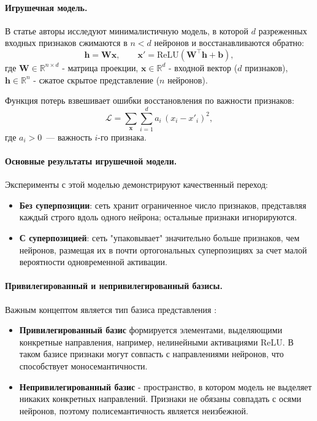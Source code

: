 \documentclass[a4paper,14pt]{extreport}
\begin{document}
\paragraph{Игрушечная модель.}
В статье \cite{elhage2022superposition} авторы исследуют минималистичную модель,
в которой $d$ разреженных входных признаков сжимаются в $n < d$ нейронов и
восстанавливаются обратно:
\begin{equation}
    \mathbf{h} = \mathbf{W}\mathbf{x},
    \qquad
    \mathbf{x}' = \mathrm{ReLU}\!\left(\mathbf{W}^{\!\top} \mathbf{h} + \mathbf{b}\right),
    \label{eq:toy_model}
\end{equation}
где $\mathbf{W} \in \mathbb{R}^{n \times d}$ - матрица проекции,
$\mathbf{x} \in \mathbb{R}^d$ - входной вектор ($d$ признаков),
$\mathbf{h} \in \mathbb{R}^n$ - сжатое скрытое представление ($n$ нейронов).

Функция потерь взвешивает ошибки восстановления по важности признаков:
\begin{equation}
    \mathcal{L} = \sum_{\mathbf{x}} \sum_{i=1}^{d} a_i\,(x_i - x'_i)^2,
    \label{eq:toy_loss}
\end{equation}
где $a_i > 0$~--- важность $i$-го признака.

\paragraph{Основные результаты игрушечной модели.}
Эксперименты с этой моделью демонстрируют качественный переход:
\begin{itemize}
    \item \textbf{Без суперпозиции}: сеть хранит ограниченное
          число признаков, представляя каждый строго вдоль одного нейрона; остальные
          признаки игнорируются.
    \item \textbf{С суперпозицией}: сеть "упаковывает"
          значительно больше признаков, чем нейронов, размещая их в почти ортогональных
          суперпозициях за счет малой вероятности одновременной активации.
\end{itemize}

\paragraph{Привилегированный и непривилегированный базисы.}
Важным концептом является тип базиса представления \cite{bereska2024mechanistic}:
\begin{itemize}
    \item \textbf{Привилегированный базис} формируется элементами,
          выделяющими конкретные направления, например, нелинейными активациями
          ReLU. В таком базисе признаки
          могут совпасть с направлениями нейронов, что способствует моносемантичности.
    \item \textbf{Непривилегированный базис} - пространство, в котором модель
          не выделяет никаких конкретных направлений. Признаки не обязаны
          совпадать с осями нейронов, поэтому полисемантичность является неизбежной.
\end{itemize}
\end{document}
